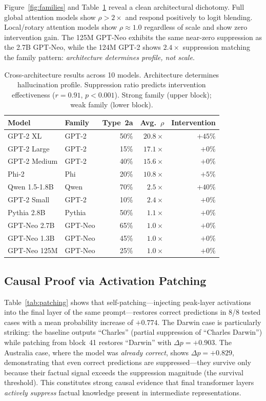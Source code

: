 \documentclass{article}
\begin{document}
Figure~\ref{fig:families} and Table~\ref{tab:families} reveal a clean
architectural dichotomy. Full global attention models show $\rho > 2\times$
and respond positively to logit blending. Local/rotary attention models show
$\rho \approx 1.0$ regardless of scale and show zero intervention gain.
The 125M GPT-Neo exhibits the same near-zero suppression as the 2.7B
GPT-Neo, while the 124M GPT-2 shows $2.4\times$ suppression matching the
family pattern: \emph{architecture determines profile, not scale}.

\begin{table}[htbp]
\caption{Cross-architecture results across 10 models.
Architecture determines hallucination profile.
Suppression ratio predicts intervention effectiveness ($r=0.91$,
$p<0.001$). Strong family (upper block); weak family (lower block).}
\label{tab:families}
\centering\small
\begin{tabular}{llrrr}
\toprule
\textbf{Model} & \textbf{Family}
  & \textbf{Type~2a} & \textbf{Avg.\ $\rho$} & \textbf{Intervention} \\
\midrule
GPT-2 XL      & GPT-2   & 50\% & $20.8\times$ & $+45\%$ \\
GPT-2 Large   & GPT-2   & 15\% & $17.1\times$ & $+0\%$  \\
GPT-2 Medium  & GPT-2   & 40\% & $15.6\times$ & $+0\%$  \\
Phi-2         & Phi     & 20\% & $10.8\times$ & $+5\%$  \\
Qwen 1.5-1.8B & Qwen    & 70\% &  $2.5\times$ & $+40\%$ \\
GPT-2 Small   & GPT-2   & 10\% &  $2.4\times$ & $+0\%$  \\
\midrule
Pythia 2.8B   & Pythia  & 50\% &  $1.1\times$ & $+0\%$  \\
GPT-Neo 2.7B  & GPT-Neo & 65\% &  $1.0\times$ & $+0\%$  \\
GPT-Neo 1.3B  & GPT-Neo & 45\% &  $1.0\times$ & $+0\%$  \\
GPT-Neo 125M  & GPT-Neo & 25\% &  $1.0\times$ & $+0\%$  \\
\bottomrule
\end{tabular}
\end{table}

\subsection{Causal Proof via Activation Patching}

Table~\ref{tab:patching} shows that self-patching---injecting peak-layer
activations into the final layer of the same prompt---restores correct
predictions in 8/8 tested cases with a mean probability increase of
$+0.774$.
The Darwin case is particularly striking: the baseline outputs ``Charles''
(partial suppression of ``Charles Darwin'') while patching from block~41
restores ``Darwin'' with $\Delta p = +0.903$.
The Australia case, where the model was \emph{already correct}, shows
$\Delta p = +0.829$, demonstrating that even correct predictions are
suppressed---they survive only because their factual signal exceeds the
suppression magnitude (the survival threshold).
This constitutes strong causal evidence that final transformer layers
\emph{actively suppress} factual knowledge present in intermediate
representations.
\end{document}
